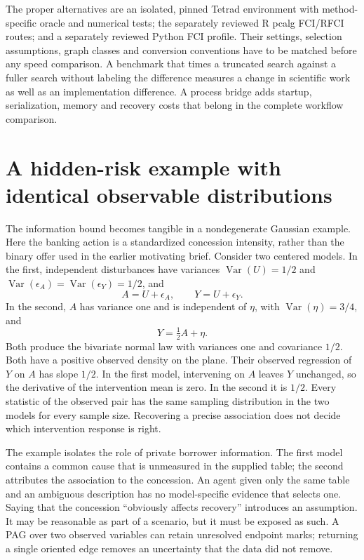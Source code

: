 The proper alternatives are an isolated, pinned Tetrad environment with
method-specific oracle and numerical tests; the separately reviewed R pcalg
FCI/RFCI routes; and a separately reviewed Python FCI profile. Their settings,
selection assumptions, graph classes and conversion conventions have to be
matched before any speed comparison. A benchmark that times a truncated search
against a fuller search without labeling the difference measures a change in
scientific work as well as an implementation difference. A process bridge adds
startup, serialization, memory and recovery costs that belong in the complete
workflow comparison.

\section{A hidden-risk example with identical observable distributions}

The information bound becomes tangible in a nondegenerate Gaussian example.
Here the banking action is a standardized concession intensity, rather than the
binary offer used in the earlier motivating brief. Consider two centered models.
In the first, independent disturbances have variances
$\operatorname{Var}(U)=1/2$ and
$\operatorname{Var}(\epsilon_A)=\operatorname{Var}(\epsilon_Y)=1/2$, and
\[
 A=U+\epsilon_A,\qquad Y=U+\epsilon_Y.
\]
In the second, $A$ has variance one and is independent of $\eta$, with
$\operatorname{Var}(\eta)=3/4$, and
\[
 Y=\tfrac12 A+\eta.
\]
Both produce the bivariate normal law with variances one and covariance $1/2$.
Both have a positive observed density on the plane. Their observed regression
of $Y$ on $A$ has slope $1/2$. In the first model, intervening on $A$ leaves
$Y$ unchanged, so the derivative of the intervention mean is zero. In the
second it is $1/2$. Every statistic of the observed pair has the same sampling
distribution in the two models for every sample size. Recovering a precise
association does not decide which intervention response is right.

The example isolates the role of private borrower information. The first model
contains a common cause that is unmeasured in the supplied table; the second
attributes the association to the concession. An agent given only the same
table and an ambiguous description has no model-specific evidence that selects
one. Saying that the concession ``obviously affects recovery'' introduces an
assumption. It may be reasonable as part of a scenario, but it must be exposed
as such. A PAG over two observed variables can retain unresolved endpoint marks;
returning a single oriented edge removes an uncertainty that the data did not
remove.

